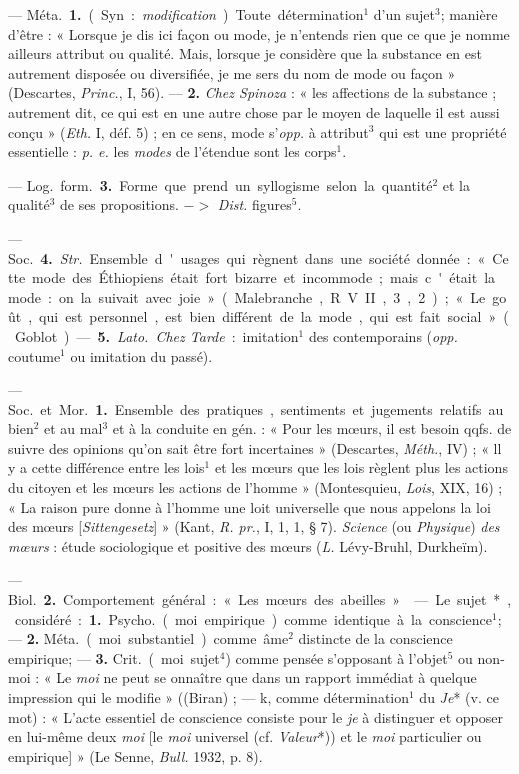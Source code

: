\begin{itemize}[leftmargin=1cm, label=, itemsep=1pt]
 — \si{Méta.} {\bf 1.} (Syn. : {\it modification}). Toute
détermination$^1$ d’un sujet$^3$; manière d’être : « Lorsque je dis ici façon
ou mode, je n’entends rien que ce que je nomme ailleurs attribut ou qualité.
Mais, lorsque je considère que la substance en est autrement disposée ou
diversifiée, je me sers du nom de mode ou façon » (Descartes, {\it Princ.},
I, 56). — {\bf 2.} {\it Chez Spinoza} : « les affections de la substance ;
autrement dit, ce qui est en une autre chose par le moyen de laquelle il est
aussi conçu » ({\it Eth.} I, déf. 5) ; en ce sens, mode s’{\it opp.} à
attribut$^3$ qui est une propriété essentielle : {\it p. e.} les {\it modes}
de l'étendue sont les corps$^1$.

— \si{Log.} \si{form.} {\bf 3.} Forme que prend un syllogisme selon la
quantité$^2$ et la qualité$^3$ de ses propositions. $->$ {\it Dist.}
figures$^5$.

 — \si{Soc.} {\bf 4.} {\it Str.} Ensemble d'usages qui
règnent dans une société
donnée : « Cette mode des Éthiopiens était fort bizarre et incommode; mais
c'était la mode : on la suivait avec joie » (Malebranche, R. V. II, 3, 2) ;
« Le goût, qui est personnel, est bien différent de la mode, qui est fait
social » (Goblot). — {\bf 5.} {\it Lato.} {\it Chez Tarde} : imitation$^1$
des contemporains ({\it opp.} coutume$^1$ ou imitation du passé).

 — \si{Soc.} et \si{Mor.} {\bf 1.} Ensemble des pratiques,
sentiments et jugements relatifs au bien$^2$ et au mal$^3$ et à la conduite
en gén. : « Pour les mœurs, il est besoin qqfs. de suivre des opinions qu'on
sait être fort incertaines » (Descartes, {\it Méth.}, IV) ; « ll y a cette
différence entre les lois$^1$ et les mœurs que les lois règlent plus les
actions du citoyen et les mœurs les actions de l’homme » (Montesquieu,
{\it Lois}, XIX, 16) ; « La raison pure donne à l’homme une loit universelle
que nous appelons la loi des mœurs [{\it Sittengesetz}] » (Kant, {\it R.
pr.}, I, 1, 1, § 7). {\it Science} (ou {\it Physique}) {\it des mœurs} :
étude sociologique et positive des mœurs ({\it L.} Lévy-Bruhl, Durkheïm).

— \si{Biol.} {\bf 2.} Comportement général : « Les mœurs des abeilles ».

 — Le sujet*, considéré : {\bf 1.} \si{Psycho.} (moi empirique) comme
identique à la conscience$^1$; — {\bf 2.} \si{Méta.} (moi substantiel) comme
âme$^2$ distincte de la conscience empirique; — {\bf 3.} \si{Crit.} (moi
sujet$^4$) comme pensée s'opposant à l'objet$^5$ ou non-moi : « Le {\it moi}
ne peut se onnaître que dans un rapport immédiat à quelque impression qui le
modifie » ((Biran) ; — k, comme détermination$^1$ du {\it Je}* (v. ce mot) :
« L’acte essentiel de conscience consiste pour le {\it je} à distinguer et
opposer en lui-même deux {\it moi} [le {\it moi} universel (cf.
{\it Valeur}*))
et le {\it moi} particulier ou empirique] » (Le Senne, {\it Bull.} 1932, p. 8).


\end{itemize}
